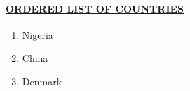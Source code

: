 \documentclass{article}
\begin{document}
		\paragraph{\underline{ORDERED LIST OF COUNTRIES}}
			\begin{enumerate}
				\item Nigeria
				\item China
				\item Denmark
			\end{enumerate}
	
\end{document}
